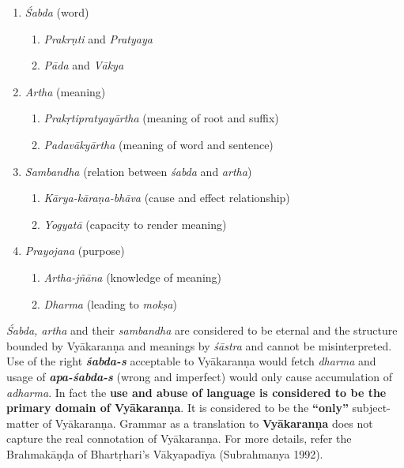 \begin{enumerate}
\itemsep=0pt
\item \textit{Śabda} (word)
 
\begin{enumerate}
\itemsep=0pt
\item \textit{Prakrṇti} and \textit{Pratyaya}

 \item \textit{Pāda} and \textit{Vākya}
\end{enumerate}

 \item \textit{Artha} (meaning)
 
\begin{enumerate}
\itemsep=0pt
\item \textit{Prakṛtipratyayārtha} (meaning of root and suffix)

 \item \textit{Padavākyārtha} (meaning of word and sentence) 
\end{enumerate}

 \item \textit{Sambandha} (relation between \textit{śabda} and \textit{artha})
 
\begin{enumerate}
\itemsep=0pt
\item \textit{Kārya-kāraṇa-bhāva} (cause and effect relationship)

 \item \textit{Yogyatā} (capacity to render meaning)
\end{enumerate}

 \item \textit{Prayojana} (purpose)
 
\begin{enumerate}
\itemsep=0pt
\item \textit{Artha-jñāna} (knowledge of meaning)

 \item \textit{Dharma} (leading to \textit{mokṣa})
\end{enumerate}

\end{enumerate}

\textit{Śabda, artha} and their \textit{sambandha} are considered to be eternal and the structure bounded by Vyākaranṇa and meanings by \textit{śāstra} and cannot be misinterpreted. Use of the right \textbf{\textit{śabda-s}} acceptable to Vyākaranṇa would fetch \textit{dharma} and usage of \textbf{\textit{apa-śabda-s}} (wrong and imperfect) would only cause accumulation of \textit{adharma}. In fact the \textbf{use and abuse of language is considered to be the primary domain of Vyākaranṇa}. It is considered to be the \textbf{“only”} subject-matter of Vyākaranṇa. Grammar as a translation to \textbf{Vyākaranṇa} does not capture the real connotation of Vyākaranṇa. For more details, refer the Brahmakāṇḍa of Bhartṛhari’s Vākyapadīya (Subrahmanya 1992).

